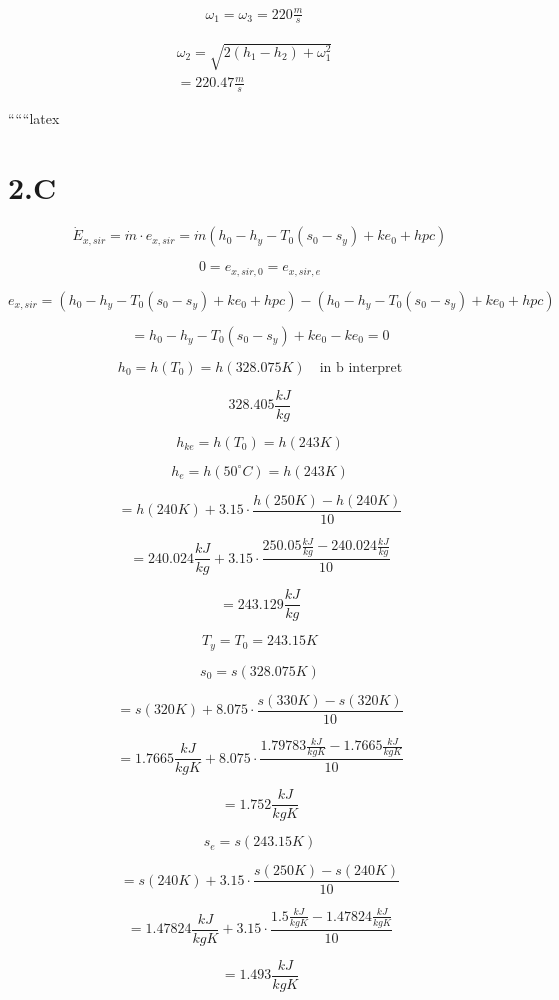 \begin{align*}
\omega_1 = \omega_3 = 220 \frac{m}{s} &
\end{align*}

\begin{align*}
\omega_2 = \sqrt{2(h_1 - h_2) + \omega_1^2} & \\
= 220.47 \frac{m}{s} &
\end{align*}

``````latex


\section*{2.C}

\[
\dot{E}_{x,sir} = \dot{m} \cdot e_{x,sir} = \dot{m} (h_0 - h_y - T_0 (s_0 - s_y) + ke_0 + hpc)
\]

\[
0 = e_{x,sir,0} = e_{x,sir,e}
\]

\[
e_{x,sir} = (h_0 - h_y - T_0 (s_0 - s_y) + ke_0 + hpc) - (h_0 - h_y - T_0 (s_0 - s_y) + ke_0 + hpc)
\]

\[
= h_0 - h_y - T_0 (s_0 - s_y) + ke_0 - ke_0 = 0
\]

\[
h_0 = h(T_0) = h(328.075K) \quad \text{in b interpret}
\]

\[
328.405 \frac{kJ}{kg}
\]

\[
h_{ke} = h(T_0) = h(243K)
\]

\[
h_e = h(50^\circ C) = h(243K)
\]

\[
= h(240K) + 3.15 \cdot \frac{h(250K) - h(240K)}{10}
\]

\[
= 240.024 \frac{kJ}{kg} + 3.15 \cdot \frac{250.05 \frac{kJ}{kg} - 240.024 \frac{kJ}{kg}}{10}
\]

\[
= 243.129 \frac{kJ}{kg}
\]

\[
T_y = T_0 = 243.15K
\]

\[
s_0 = s(328.075K)
\]

\[
= s(320K) + 8.075 \cdot \frac{s(330K) - s(320K)}{10}
\]

\[
= 1.7665 \frac{kJ}{kgK} + 8.075 \cdot \frac{1.79783 \frac{kJ}{kgK} - 1.7665 \frac{kJ}{kgK}}{10}
\]

\[
= 1.752 \frac{kJ}{kgK}
\]

\[
s_e = s(243.15K)
\]

\[
= s(240K) + 3.15 \cdot \frac{s(250K) - s(240K)}{10}
\]

\[
= 1.47824 \frac{kJ}{kgK} + 3.15 \cdot \frac{1.5 \frac{kJ}{kgK} - 1.47824 \frac{kJ}{kgK}}{10}
\]

\[
= 1.493 \frac{kJ}{kgK}
\]

